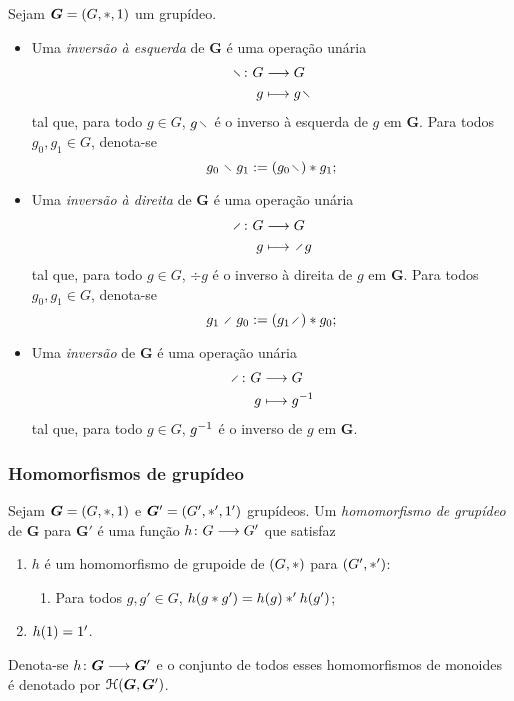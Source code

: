 \begin{definition}[Inversão]
Sejam $\bm G = (G,\ast,1)$ um grupídeo.
	\begin{itemize}
	\item Uma \emph{inversão à esquerda} de $\bm G$ é uma operação unária
		\begin{align*}
		\func{\vid}{G}{G}{g}{g \vid}
		\end{align*}
	tal que, para todo $g \in G$, $g \vid$ é o inverso à esquerda de $g$ em $\bm G$. Para todos $g_0,g_1 \in G$, denota-se
		\begin{equation*}
		g_0 \vid g_1 := (g_0 \vid) \opb g_1;
		\end{equation*}

	\item Uma \emph{inversão à direita} de $\bm G$ é uma operação unária
		\begin{align*}
		\func{\div}{G}{G}{g}{\div g}
		\end{align*}
	tal que, para todo $g \in G$, $\div g$ é o inverso à direita de $g$ em $\bm G$. Para todos $g_0,g_1 \in G$, denota-se
		\begin{equation*}
		g_1 \div g_0 := (g_1 \div) \opb g_0;
		\end{equation*}

	\item Uma \emph{inversão} de $\bm G$ é uma operação unária
		\begin{align*}
		\func{\div}{G}{G}{g}{g\inv}
		\end{align*}
	tal que, para todo $g \in G$, $g^{-1}$ é o inverso de $g$ em $\bm G$.
	\end{itemize}
\end{definition}


\subsubsection{Homomorfismos de grupídeo}

\begin{definition}
Sejam $\bm G=(G,\ast,1)$ e $\bm G'=(G',\ast',1')$ grupídeos. Um \emph{homomorfismo de grupídeo} de $\bm G$ para $\bm G'$ é uma função ${h}\colon {G} \longrightarrow {G'}$ que satisfaz
	\begin{enumerate}
	\item $h$ é um homomorfismo de grupoide de $(G,\ast)$ para $(G',\ast')$:
		\begin{enumerate}
		\item Para todos $g,g' \in G$, $h(g \ast g') = h(g) \ast' h(g')$;
		\end{enumerate}
	\item $h(1)=1'$.
	\end{enumerate}
Denota-se ${h}\colon {\bm G} \longrightarrow {\bm G'}$ e o conjunto de todos esses homomorfismos de monoides é denotado por $\mathcal{H}(\bm G,\bm G')$.
\end{definition}

